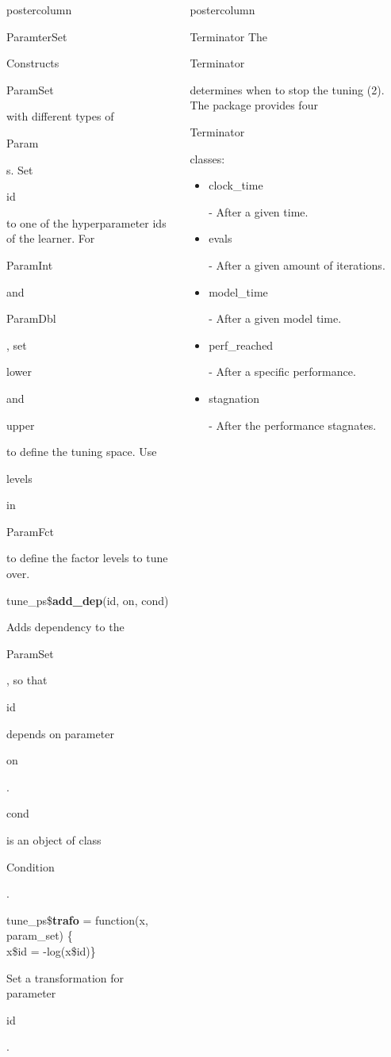 \documentclass{beamer}
\newlength{\columnheight} %
\newcommand{\codeinline}[1]{\begin{codeboxinline}#1\end{codeboxinline}}
\begin{document}
\begin{frame}[fragile]{}
\begin{columns}
\begin{column}{.245\textwidth}
\begin{beamercolorbox}[center]{postercolumn}
\begin{minipage}{.98\textwidth}
{\begin{myblock}{ParamterSet}
\begin{codeboxmultiline}[width=21cm]
							\end{codeboxmultiline}
							Constructs \codeinline{ParamSet} with different types of \codeinline{Param}s. Set \codeinline{id} to one of the hyperparameter ids of the learner. For  \codeinline{ParamInt} and \codeinline{ParamDbl}, set \codeinline{lower} and \codeinline{upper} to define the tuning space. Use \codeinline{levels} in \codeinline{ParamFct} to define the factor levels to tune over.
							\\
							\begin{codebox}
								tune\_ps\$\textbf{add\_dep}(id, on, cond)
							\end{codebox}
							Adds dependency to the \codeinline{ParamSet}, so that \codeinline{id} depends on parameter \codeinline{on}.
							\codeinline{cond} is an object of class \codeinline{Condition}.
							\\
							\begin{codeboxmultiline}[width=26cm]
								tune\_ps\$\textbf{trafo} = function(x, param\_set) \{ \\
								\hspace*{1ex}x\$id = -log(x\$id)\}
							\end{codeboxmultiline}
							Set a transformation for parameter \codeinline{id}.
						\end{myblock}
						\vfill}
				\end{minipage}
			\end{beamercolorbox}
		\end{column}
		\begin{column}{.245\textwidth}
			\begin{beamercolorbox}[center]{postercolumn}
				\begin{minipage}{.98\textwidth}
					\parbox[t][\columnheight]{\textwidth}{
						\begin{myblock}{Terminator}
							The \codeinline{Terminator} determines when to stop the tuning (2). The package provides four \codeinline{Terminator} classes:
							\\
							\begin{itemize}
								\item \codeinline{clock\_time} - After a given time.
								\item \codeinline{evals} - After a given amount of iterations.
								\item \codeinline{model\_time}  - After a given model time.
								\item \codeinline{perf\_reached} - After a specific performance.
								\item \codeinline{stagnation} - After the performance stagnates.

\end{itemize}
\end{myblock}}
\end{minipage}
\end{beamercolorbox}
\end{column}
\end{columns}
\end{frame}
\end{document}

